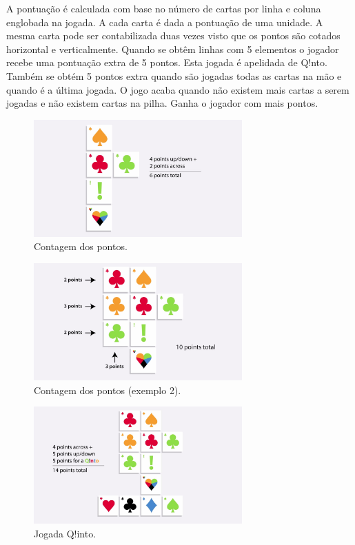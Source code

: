 \documentclass[a4paper]{article}
\begin{document}
\par
A pontuação é calculada com base no número de cartas por linha e coluna englobada na jogada. A cada carta é dada a pontuação de uma unidade. A mesma carta pode ser contabilizada duas vezes visto que os pontos são cotados horizontal e verticalmente. Quando se obtêm linhas com 5 elementos o jogador recebe uma pontuação extra de 5 pontos. Esta jogada é apelidada de Q!nto. Também se obtém 5 pontos extra quando são jogadas todas as cartas na mão e quando é a última jogada. O jogo acaba quando não existem mais cartas a serem jogadas e não existem cartas na pilha. Ganha o jogador com mais pontos.

\begin{figure}[h]
\centering
\includegraphics[width=80mm]{points.jpg}
\caption{Contagem dos pontos. \label{points1}}
\end{figure}

\begin{figure}[hb!]
\centering
\includegraphics[width=80mm]{points2.jpg}
\caption{Contagem dos pontos (exemplo 2). \label{points2}}
\end{figure}

\begin{figure}[ht!]
\centering
\includegraphics[width=80mm]{quinto.jpg}
\caption{Jogada Q!into. \label{quinto}}
\end{figure}
\end{document}
